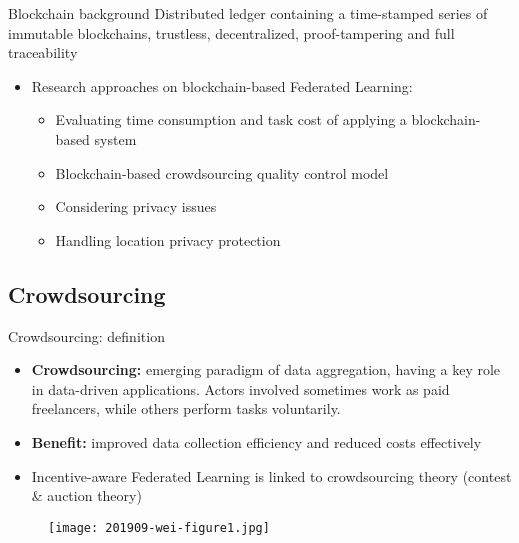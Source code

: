 \begin{frame}{Blockchain background}
  \alert{Distributed ledger containing a time-stamped series of immutable blockchains, trustless, decentralized, proof-tampering and full traceability}
  \begin{itemize}
    \item Research approaches on blockchain-based Federated Learning:
          \begin{itemize}
            \item Evaluating time consumption and task cost of applying a blockchain-based system%
            \item Blockchain-based crowdsourcing quality control model%
            \item Considering privacy issues%
            \item Handling location privacy protection%
          \end{itemize}
  \end{itemize}
\end{frame}

\subsection{Crowdsourcing}

\begin{frame}{Crowdsourcing: definition}
  \begin{itemize}
  \item \textbf{Crowdsourcing:} emerging paradigm of data aggregation, having a key role in data-driven applications. Actors involved sometimes work as paid freelancers, while others perform tasks voluntarily.
  \item \textbf{Benefit:} improved data collection efficiency and reduced costs effectively%
  \item Incentive-aware Federated Learning is linked to crowdsourcing theory (contest \& auction theory)
  \end{itemize}
  \begin{figure}[h]
        \centering
        \texttt{[image: 201909-wei-figure1.jpg]}
      \end{figure}
\end{frame}

